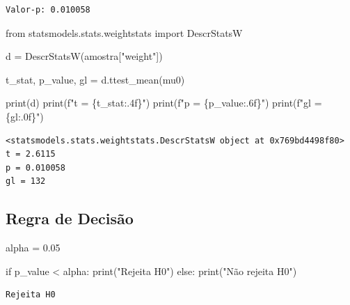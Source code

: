 \documentclass[
  letterpaper,
  DIV=11,
  numbers=noendperiod]{scrreprt}
\newenvironment{Shaded}{\begin{snugshade}}{\end{snugshade}}
\newcommand{\BuiltInTok}[1]{\textcolor[rgb]{0.00,0.23,0.31}{#1}}
\newcommand{\ControlFlowTok}[1]{\textcolor[rgb]{0.00,0.23,0.31}{#1}}
\newcommand{\FloatTok}[1]{\textcolor[rgb]{0.68,0.00,0.00}{#1}}
\newcommand{\ImportTok}[1]{\textcolor[rgb]{0.00,0.46,0.62}{#1}}
\newcommand{\NormalTok}[1]{\textcolor[rgb]{0.00,0.23,0.31}{#1}}
\newcommand{\OperatorTok}[1]{\textcolor[rgb]{0.37,0.37,0.37}{#1}}
\newcommand{\SpecialCharTok}[1]{\textcolor[rgb]{0.37,0.37,0.37}{#1}}
\newcommand{\SpecialStringTok}[1]{\textcolor[rgb]{0.13,0.47,0.30}{#1}}
\newcommand{\StringTok}[1]{\textcolor[rgb]{0.13,0.47,0.30}{#1}}
\begin{document}
\begin{verbatim}
Valor-p: 0.010058
\end{verbatim}

\begin{Shaded}
\begin{Highlighting}[]
\ImportTok{from}\NormalTok{ statsmodels.stats.weightstats }\ImportTok{import}\NormalTok{ DescrStatsW}

\NormalTok{d }\OperatorTok{=}\NormalTok{ DescrStatsW(amostra[}\StringTok{"weight"}\NormalTok{])}

\NormalTok{t\_stat, p\_value, gl }\OperatorTok{=}\NormalTok{ d.ttest\_mean(mu0)}

\BuiltInTok{print}\NormalTok{(d)}
\BuiltInTok{print}\NormalTok{(}\SpecialStringTok{f"t = }\SpecialCharTok{\{}\NormalTok{t\_stat}\SpecialCharTok{:.4f\}}\SpecialStringTok{"}\NormalTok{)}
\BuiltInTok{print}\NormalTok{(}\SpecialStringTok{f"p = }\SpecialCharTok{\{}\NormalTok{p\_value}\SpecialCharTok{:.6f\}}\SpecialStringTok{"}\NormalTok{)}
\BuiltInTok{print}\NormalTok{(}\SpecialStringTok{f"gl = }\SpecialCharTok{\{}\NormalTok{gl}\SpecialCharTok{:.0f\}}\SpecialStringTok{"}\NormalTok{)}
\end{Highlighting}
\end{Shaded}

\begin{verbatim}
<statsmodels.stats.weightstats.DescrStatsW object at 0x769bd4498f80>
t = 2.6115
p = 0.010058
gl = 132
\end{verbatim}

\subsection{Regra de Decisão}\label{regra-de-decisuxe3o-2}

\begin{Shaded}
\begin{Highlighting}[]
\NormalTok{alpha }\OperatorTok{=} \FloatTok{0.05} 

\ControlFlowTok{if}\NormalTok{ p\_value }\OperatorTok{\textless{}}\NormalTok{ alpha: }
  \BuiltInTok{print}\NormalTok{(}\StringTok{"Rejeita H0"}\NormalTok{) }
\ControlFlowTok{else}\NormalTok{: }
  \BuiltInTok{print}\NormalTok{(}\StringTok{"Não rejeita H0"}\NormalTok{)}
\end{Highlighting}
\end{Shaded}

\begin{verbatim}
Rejeita H0
\end{verbatim}
\end{document}
